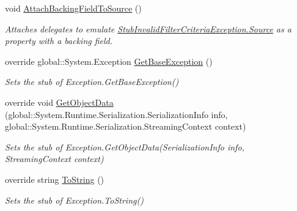 \begin{DoxyCompactItemize}
void \hyperlink{class_system_1_1_reflection_1_1_fakes_1_1_stub_invalid_filter_criteria_exception_a64c849c41e0e2e944bd610934e40d607}{Attach\-Backing\-Field\-To\-Source} ()
\begin{DoxyCompactList}\small\item\em Attaches delegates to emulate \hyperlink{class_system_1_1_reflection_1_1_fakes_1_1_stub_invalid_filter_criteria_exception_ae35d5c978969c219efeb62d5d17c75e9}{Stub\-Invalid\-Filter\-Criteria\-Exception.\-Source} as a property with a backing field.\end{DoxyCompactList}\item 
override global\-::\-System.\-Exception \hyperlink{class_system_1_1_reflection_1_1_fakes_1_1_stub_invalid_filter_criteria_exception_a26150c7a0c6f75bf29ed7366de7c1644}{Get\-Base\-Exception} ()
\begin{DoxyCompactList}\small\item\em Sets the stub of Exception.\-Get\-Base\-Exception()\end{DoxyCompactList}\item 
override void \hyperlink{class_system_1_1_reflection_1_1_fakes_1_1_stub_invalid_filter_criteria_exception_a42160c76077738e362c6bfb4ecdba2a1}{Get\-Object\-Data} (global\-::\-System.\-Runtime.\-Serialization.\-Serialization\-Info info, global\-::\-System.\-Runtime.\-Serialization.\-Streaming\-Context context)
\begin{DoxyCompactList}\small\item\em Sets the stub of Exception.\-Get\-Object\-Data(\-Serialization\-Info info, Streaming\-Context context)\end{DoxyCompactList}\item 
override string \hyperlink{class_system_1_1_reflection_1_1_fakes_1_1_stub_invalid_filter_criteria_exception_a787ceb70ed50237fab9109ea45cf4461}{To\-String} ()
\begin{DoxyCompactList}\small\item\em Sets the stub of Exception.\-To\-String()\end{DoxyCompactList}\end{DoxyCompactItemize}
